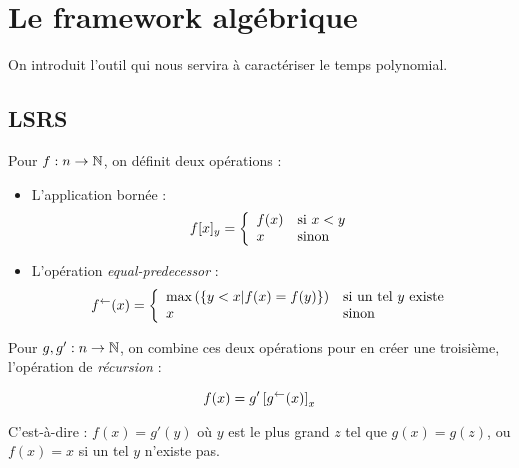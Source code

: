 	
	
	
	\section{Le framework algébrique} %
		\label{sec:framework_algebrique}
	
	On introduit l'outil qui nous servira à caractériser le temps polynomial.
	
		\subsection{LSRS} %
			\label{subsec:LSRS}
		
		
		
			\begin{definition}
				\label{def:app_bornee_eq_pred}
				Pour $f : n \to \mathbb{N}$, on définit deux opérations :
				
				\begin{itemize}
					\item 	L'application bornée :
					\[
						f[x]_y = \left\lbrace \begin{array}{ll} 
										f(x) & \text{si $x<y$} \\
										x 	& \text{sinon}
									 \end{array} \right.
					\]
					
					\item 	L'opération \emph{equal-predecessor} :
					\[
						f^{\leftarrow}(x) = \left\lbrace \begin{array}{ll} 
													\max\left(\left\lbrace y < x | f(x) = f(y)\right\rbrace\right) & \text{si un tel $y$ existe} \\
													x	& \text{sinon}
												 \end{array} \right.
					\]
				\end{itemize}
				
				Pour $g, g' : n \to \mathbb{N}$, on combine ces deux opérations pour en créer une troisième, l'opération de \emph{récursion} :
				
				\[
					f(x) = g'\left[ g^{\leftarrow}(x) \right]_{x}
				\]
				
				C'est-à-dire : $f(x) = g'(y)$ où $y$ est le plus grand $z$ tel que $g(x) = g(z)$, ou $f(x) = x$ si un tel $y$ n'existe pas.
			\end{definition}
			
